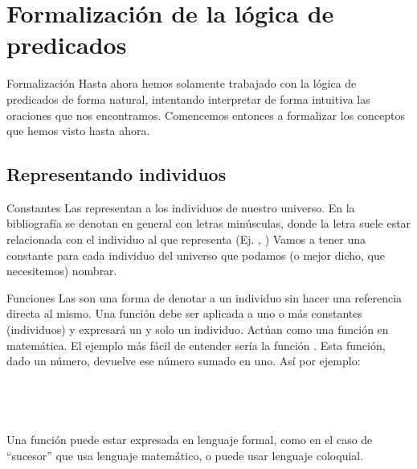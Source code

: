 
\section{Formalización de la lógica de predicados}


\begin{frame}{Formalización}
  Hasta ahora hemos solamente trabajado con la lógica de predicados de forma
  natural, intentando interpretar de forma intuitiva las oraciones que nos encontramos.
  \jump
  Comencemos entonces a formalizar los conceptos que hemos visto hasta ahora.
\end{frame}


\subsection{Representando individuos}


\begin{frame}{Constantes}
  Las  representan a los individuos de nuestro universo.
  \jump
  En la bibliografía se denotan en general con letras minúsculas, donde la letra
  suele estar relacionada con el individuo al que representa (Ej. ,
  )
  \jump
  Vamos a tener una constante para cada individuo del universo que podamos (o
  mejor dicho, que necesitemos) nombrar.
\end{frame}


\begin{frame}{Funciones}
  Las  son una forma de denotar a un individuo sin hacer una
  referencia directa al mismo.
  \jump
  Una función debe ser aplicada a uno o más constantes (individuos) y expresará
  un y solo un individuo. Actúan como una función en matemática.
  \jump
  El ejemplo más fácil de entender sería la función . Esta función,
  dado un número, devuelve ese número sumado en uno. Así por ejemplo:\\
  \\
  \\
  \\
  \\
  \jump
  Una función puede estar expresada en lenguaje formal, como en el caso de ``sucesor''
  que usa lenguaje matemático, o puede usar lenguaje coloquial.
\end{frame}


